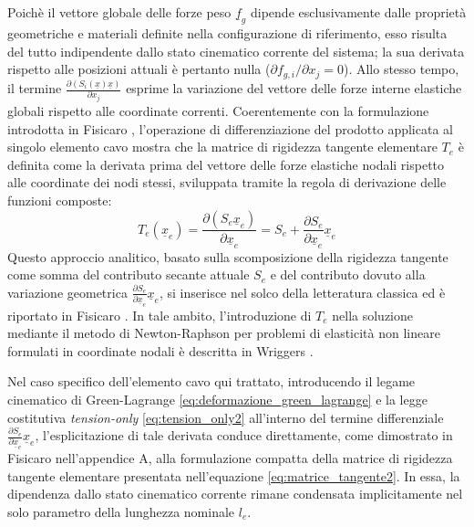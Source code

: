 Poichè il vettore globale delle forze peso $\underline{f}_g$ dipende esclusivamente dalle proprietà geometriche e materiali definite nella configurazione di riferimento, esso risulta del tutto indipendente dallo stato cinematico corrente del sistema; la sua derivata rispetto alle posizioni attuali è pertanto nulla ($\partial f_{g,i} / \partial x_j = 0$).
Allo stesso tempo, il termine $\frac{\partial (S_i(\underline{x})\underline{x})}{\partial x_j}$ esprime la variazione del vettore delle forze interne elastiche globali rispetto alle coordinate correnti. Coerentemente con la formulazione introdotta in Fisicaro \cite{Fisicaro}, l'operazione di differenziazione del prodotto applicata al singolo elemento cavo mostra che la matrice di rigidezza tangente elementare $T_e$ è definita come la derivata prima del vettore delle forze elastiche nodali rispetto alle coordinate dei nodi stessi, sviluppata tramite la regola di derivazione delle funzioni composte:
\begin{equation}
   T_e(\underline{x}_e) = \frac{\partial (S_e \underline{x}_e)}{\partial \underline{x}_e} = S_e + \frac{\partial S_e}{\partial \underline{x}_e} \underline{x}_e
   \label{eq:rigidezza_meccanica_geometrica}
\end{equation}
Questo approccio analitico, basato sulla scomposizione della rigidezza tangente come somma del contributo secante attuale $S_e$ e del contributo dovuto alla variazione geometrica $\frac{\partial S_e}{\partial \underline{x}_e} \underline{x}_e$, si inserisce nel solco della letteratura classica ed è riportato in Fisicaro \cite{Fisicaro}. In tale ambito, l'introduzione di $T_e$ nella soluzione mediante il metodo di Newton-Raphson per problemi di elasticità non lineare formulati in coordinate nodali è descritta in Wriggers \cite{Wriggers}.

\vspace{1em}
Nel caso specifico dell'elemento cavo qui trattato, introducendo il legame cinematico di Green-Lagrange \eqref{eq:deformazione_green_lagrange} e la legge costitutiva \textit{tension-only} \eqref{eq:tension_only2} all'interno del termine differenziale $\frac{\partial S_e}{\partial \underline{x}_e} \underline{x}_e$, l'esplicitazione di tale derivata conduce direttamente, come dimostrato in Fisicaro \cite{Fisicaro} nell'appendice A, alla formulazione compatta della matrice di rigidezza tangente elementare presentata nell'equazione \eqref{eq:matrice_tangente2}. In essa, la dipendenza dallo stato cinematico corrente rimane condensata implicitamente nel solo parametro della lunghezza nominale $l_e$.

